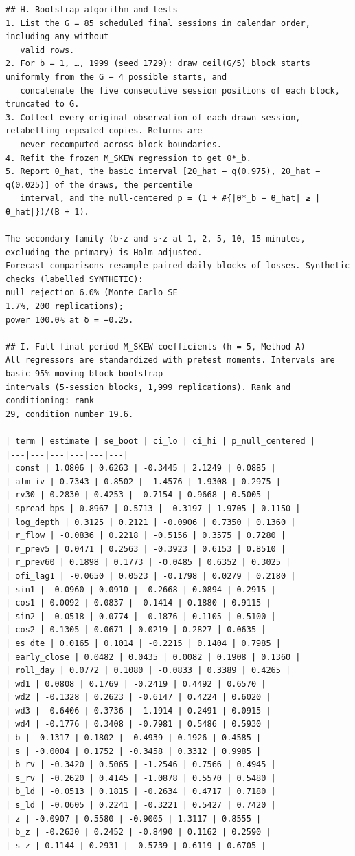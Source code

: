 \documentclass[11pt]{article}
\begin{document}
\begin{verbatim}
## H. Bootstrap algorithm and tests
1. List the G = 85 scheduled final sessions in calendar order, including any without
   valid rows.
2. For b = 1, …, 1999 (seed 1729): draw ceil(G/5) block starts uniformly from the G − 4 possible starts, and
   concatenate the five consecutive session positions of each block, truncated to G.
3. Collect every original observation of each drawn session, relabelling repeated copies. Returns are
   never recomputed across block boundaries.
4. Refit the frozen M_SKEW regression to get θ*_b.
5. Report θ_hat, the basic interval [2θ_hat − q(0.975), 2θ_hat − q(0.025)] of the draws, the percentile
   interval, and the null-centered p = (1 + #{|θ*_b − θ_hat| ≥ |θ_hat|})/(B + 1).

The secondary family (b·z and s·z at 1, 2, 5, 10, 15 minutes, excluding the primary) is Holm-adjusted.
Forecast comparisons resample paired daily blocks of losses. Synthetic checks (labelled SYNTHETIC):
null rejection 6.0% (Monte Carlo SE
1.7%, 200 replications);
power 100.0% at δ = −0.25.

## I. Full final-period M_SKEW coefficients (h = 5, Method A)
All regressors are standardized with pretest moments. Intervals are basic 95% moving-block bootstrap
intervals (5-session blocks, 1,999 replications). Rank and conditioning: rank
29, condition number 19.6.

| term | estimate | se_boot | ci_lo | ci_hi | p_null_centered |
|---|---|---|---|---|---|
| const | 1.0806 | 0.6263 | -0.3445 | 2.1249 | 0.0885 |
| atm_iv | 0.7343 | 0.8502 | -1.4576 | 1.9308 | 0.2975 |
| rv30 | 0.2830 | 0.4253 | -0.7154 | 0.9668 | 0.5005 |
| spread_bps | 0.8967 | 0.5713 | -0.3197 | 1.9705 | 0.1150 |
| log_depth | 0.3125 | 0.2121 | -0.0906 | 0.7350 | 0.1360 |
| r_flow | -0.0836 | 0.2218 | -0.5156 | 0.3575 | 0.7280 |
| r_prev5 | 0.0471 | 0.2563 | -0.3923 | 0.6153 | 0.8510 |
| r_prev60 | 0.1898 | 0.1773 | -0.0485 | 0.6352 | 0.3025 |
| ofi_lag1 | -0.0650 | 0.0523 | -0.1798 | 0.0279 | 0.2180 |
| sin1 | -0.0960 | 0.0910 | -0.2668 | 0.0894 | 0.2915 |
| cos1 | 0.0092 | 0.0837 | -0.1414 | 0.1880 | 0.9115 |
| sin2 | -0.0518 | 0.0774 | -0.1876 | 0.1105 | 0.5100 |
| cos2 | 0.1305 | 0.0671 | 0.0219 | 0.2827 | 0.0635 |
| es_dte | 0.0165 | 0.1014 | -0.2215 | 0.1404 | 0.7985 |
| early_close | 0.0482 | 0.0435 | 0.0082 | 0.1908 | 0.1360 |
| roll_day | 0.0772 | 0.1080 | -0.0833 | 0.3389 | 0.4265 |
| wd1 | 0.0808 | 0.1769 | -0.2419 | 0.4492 | 0.6570 |
| wd2 | -0.1328 | 0.2623 | -0.6147 | 0.4224 | 0.6020 |
| wd3 | -0.6406 | 0.3736 | -1.1914 | 0.2491 | 0.0915 |
| wd4 | -0.1776 | 0.3408 | -0.7981 | 0.5486 | 0.5930 |
| b | -0.1317 | 0.1802 | -0.4939 | 0.1926 | 0.4585 |
| s | -0.0004 | 0.1752 | -0.3458 | 0.3312 | 0.9985 |
| b_rv | -0.3420 | 0.5065 | -1.2546 | 0.7566 | 0.4945 |
| s_rv | -0.2620 | 0.4145 | -1.0878 | 0.5570 | 0.5480 |
| b_ld | -0.0513 | 0.1815 | -0.2634 | 0.4717 | 0.7180 |
| s_ld | -0.0605 | 0.2241 | -0.3221 | 0.5427 | 0.7420 |
| z | -0.0907 | 0.5580 | -0.9005 | 1.3117 | 0.8555 |
| b_z | -0.2630 | 0.2452 | -0.8490 | 0.1162 | 0.2590 |
| s_z | 0.1144 | 0.2931 | -0.5739 | 0.6119 | 0.6705 |


\end{verbatim}
\end{document}
